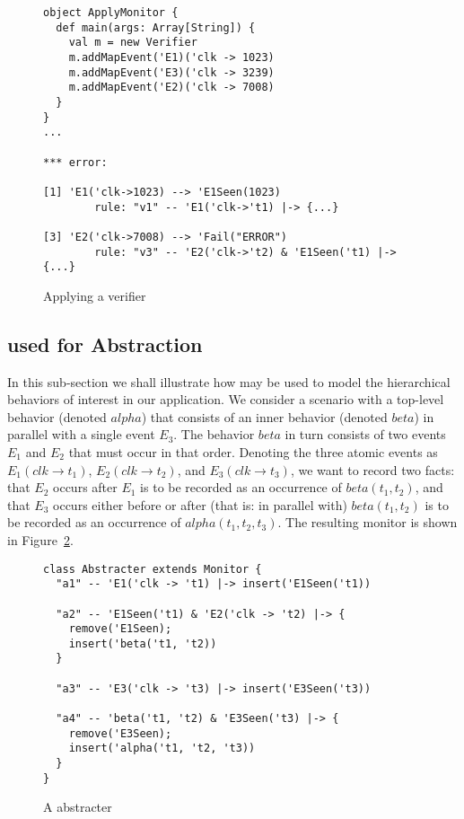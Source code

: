 \begin{figure}[htb]
\begin{small}
\begin{framed}
\sscala
\begin{lstlisting}
object ApplyMonitor {
  def main(args: Array[String]) {
    val m = new Verifier
    m.addMapEvent('E1)('clk -> 1023)
    m.addMapEvent('E3)('clk -> 3239)
    m.addMapEvent('E2)('clk -> 7008)
  }
}
...

*** error:

[1] 'E1('clk->1023) --> 'E1Seen(1023)
        rule: "v1" -- 'E1('clk->'t1) |-> {...}

[3] 'E2('clk->7008) --> 'Fail("ERROR")
        rule: "v3" -- 'E2('clk->'t2) & 'E1Seen('t1) |-> {...}
\end{lstlisting}
\end{framed}
\end{small}
\caption{Applying a \logfire{} verifier}
\label{fig:logfire-verifier-application}
\end{figure}


\subsection{\logfire{} used for Abstraction}

In this sub-section we shall illustrate how \logfire{} may be used to
model the hierarchical behaviors of interest in our application.  We
consider a scenario with a top-level behavior (denoted $alpha$) that
consists of an inner behavior (denoted $beta$) in parallel with a single
event $E_3$.  The behavior $beta$ in turn consists of two events
$E_1$ and $E_2$ that must occur in that order.  Denoting the three
atomic events as $E_1(clk \rightarrow t_1)$, $E_2(clk \rightarrow
t_2)$, and $E_3(clk \rightarrow t_3)$, we want to record two facts:
that $E_2$ occurs after $E_1$ is to be recorded as an occurrence of
$beta(t_1,t_2)$, and that $E_3$ occurs either before or after (that is: in parallel with) $beta(t_1,t_2)$ is to be recorded as an occurrence of
$alpha(t_1,t_2,t_3)$.  The resulting monitor is shown in
Figure~\ref{fig:logfire-abstracter}.

\begin{figure}
\begin{small}
\begin{framed}
\sscala
\begin{lstlisting}
class Abstracter extends Monitor {
  "a1" -- 'E1('clk -> 't1) |-> insert('E1Seen('t1))

  "a2" -- 'E1Seen('t1) & 'E2('clk -> 't2) |-> { 
    remove('E1Seen); 
    insert('beta('t1, 't2)) 
  }
  
  "a3" -- 'E3('clk -> 't3) |-> insert('E3Seen('t3))
  
  "a4" -- 'beta('t1, 't2) & 'E3Seen('t3) |-> { 
    remove('E3Seen); 
    insert('alpha('t1, 't2, 't3)) 
  }
}
\end{lstlisting}\end{framed}
\end{small}
\caption{A \logfire{} abstracter}
\label{fig:logfire-abstracter}
\end{figure}

